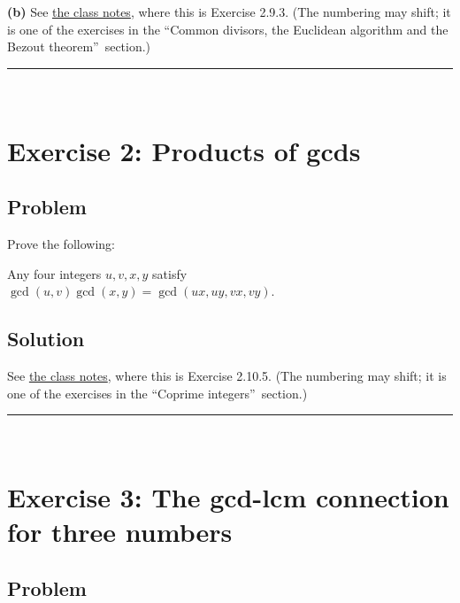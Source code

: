 \documentclass[paper=a4, fontsize=12pt]{scrartcl}%
\theoremstyle{plainsl}
\theoremstyle{definition}
\theoremstyle{remark}
\begin{document}
\textbf{(b)} See
\href{http://www-users.math.umn.edu/~dgrinber/19s/notes.pdf}{the class notes},
where this is Exercise 2.9.3. (The numbering may shift; it is one of the
exercises in the \textquotedblleft Common divisors, the Euclidean algorithm
and the Bezout theorem\textquotedblright\ section.)

\rule{\linewidth}{0.3pt} \\[0.4cm]

\section{Exercise 2: Products of gcds}

\subsection{Problem}

Prove the following:

Any four integers $u,v,x,y$ satisfy $\gcd\left(  u,v\right)  \gcd\left(
x,y\right)  =\gcd\left(  ux,uy,vx,vy\right)  $.

\subsection{Solution}

See \href{http://www-users.math.umn.edu/~dgrinber/19s/notes.pdf}{the class
notes}, where this is Exercise 2.10.5. (The numbering may shift; it is one of
the exercises in the \textquotedblleft Coprime integers\textquotedblright\ section.)

\rule{\linewidth}{0.3pt} \\[0.4cm]

\section{Exercise 3: The gcd-lcm connection for three numbers}

\subsection{Problem}
\end{document}
